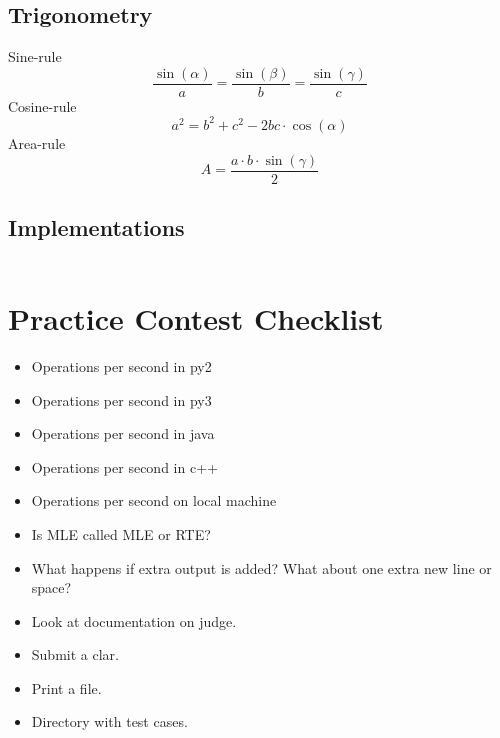 \documentclass[8pt,a4paper,landscape,oneside]{amsart}
\newcommand{\codep}[1]{\inputminted[fontsize=\large,tabsize=2,baselinestretch=1]{py}{code/#1}}
\begin{document}
\begin{multicols*}{2}
\begin{large}
    \subsection{Trigonometry}
        Sine-rule $$\frac{\sin(\alpha)}{a} = \frac{\sin(\beta)}{b} = \frac{\sin(\gamma)}{c}$$
        Cosine-rule $$a^2 = b^2 + c^2 - 2bc\cdot \cos(\alpha)$$
        Area-rule $$A = \frac{a\cdot b \cdot \sin(\gamma)}{2}$$
    \subsection{Implementations}
        \codep{Geometry/geometry.py}
\newpage
\section{Practice Contest Checklist}
\begin{itemize}
    \item Operations per second in py2
    \item Operations per second in py3
    \item Operations per second in java
    \item Operations per second in c++
    \item Operations per second on local machine
    \item Is MLE called MLE or RTE?
    \item What happens if extra output is added? What about one extra new line or space?
    \item Look at documentation on judge.
    \item Submit a clar.
    \item Print a file.
    \item Directory with test cases.
\end{itemize}


\end{large}
\end{multicols*}
\end{document}
